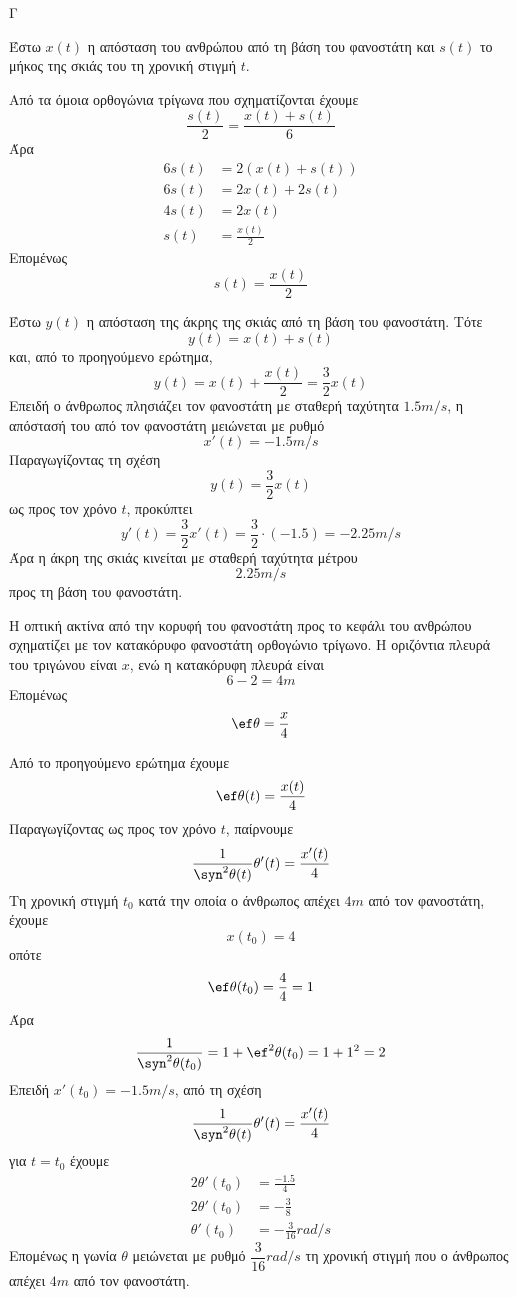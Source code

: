 \begin{thema}{Γ}
\begin{erwthma}
\item Έστω $x(t)$ η απόσταση του ανθρώπου από τη βάση του φανοστάτη και $s(t)$ το μήκος της σκιάς του τη χρονική στιγμή $t$.

Από τα όμοια ορθογώνια τρίγωνα που σχηματίζονται έχουμε
\[\frac{s(t)}{2}=\frac{x(t)+s(t)}{6}\]
Άρα
\begin{align*}
6s(t)&=2(x(t)+s(t))\\
6s(t)&=2x(t)+2s(t)\\
4s(t)&=2x(t)\\
s(t)&=\frac{x(t)}{2}
\end{align*}
Επομένως
\[s(t)=\frac{x(t)}{2}\]

\item Έστω $y(t)$ η απόσταση της άκρης της σκιάς από τη βάση του φανοστάτη.
Τότε
\[y(t)=x(t)+s(t)\]
και, από το προηγούμενο ερώτημα,
\[y(t)=x(t)+\frac{x(t)}{2}=\frac{3}{2}x(t)\]
Επειδή ο άνθρωπος πλησιάζει τον φανοστάτη με σταθερή ταχύτητα $1.5\si{m/s}$, η απόστασή του από τον φανοστάτη μειώνεται με ρυθμό
\[x'(t)=-1.5\si{m/s}\]
Παραγωγίζοντας τη σχέση
\[y(t)=\frac{3}{2}x(t)\]
ως προς τον χρόνο $t$, προκύπτει
\[y'(t)=\frac{3}{2}x'(t)=\frac{3}{2}\cdot(-1.5)=-2.25\si{m/s}\]
Άρα η άκρη της σκιάς κινείται με σταθερή ταχύτητα μέτρου
\[2.25\si{m/s}\]
προς τη βάση του φανοστάτη.

\item Η οπτική ακτίνα από την κορυφή του φανοστάτη προς το κεφάλι του ανθρώπου σχηματίζει με τον κατακόρυφο φανοστάτη ορθογώνιο τρίγωνο.
Η οριζόντια πλευρά του τριγώνου είναι $x$, ενώ η κατακόρυφη πλευρά είναι
\[6-2=4\si{m}\]
Επομένως
\[\ef\theta=\frac{x}{4}\]

\item Από το προηγούμενο ερώτημα έχουμε
\[\ef\theta(t)=\frac{x(t)}{4}\]
Παραγωγίζοντας ως προς τον χρόνο $t$, παίρνουμε
\[\frac{1}{\syn^2\theta(t)}\theta'(t)=\frac{x'(t)}{4}\]
Τη χρονική στιγμή $t_0$ κατά την οποία ο άνθρωπος απέχει $4\si{m}$ από τον φανοστάτη, έχουμε
\[x(t_0)=4\]
οπότε
\[\ef\theta(t_0)=\frac{4}{4}=1\]
Άρα
\[\frac{1}{\syn^2\theta(t_0)}=1+\ef^2\theta(t_0)=1+1^2=2\]
Επειδή $x'(t_0)=-1.5\si{m/s}$, από τη σχέση
\[\frac{1}{\syn^2\theta(t)}\theta'(t)=\frac{x'(t)}{4}\]
για $t=t_0$ έχουμε
\begin{align*}
2\theta'(t_0)&=\frac{-1.5}{4}\\
2\theta'(t_0)&=-\frac{3}{8}\\
\theta'(t_0)&=-\frac{3}{16}\si{rad/s}
\end{align*}
Επομένως η γωνία $\theta$ μειώνεται με ρυθμό $\dfrac{3}{16}\si{rad/s}$ τη χρονική στιγμή που ο άνθρωπος απέχει $4\si{m}$ από τον φανοστάτη.
\end{erwthma}
\end{thema}

